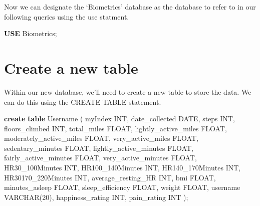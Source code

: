 \documentclass[]{book}
\newenvironment{Shaded}{\begin{snugshade}}{\end{snugshade}}
\newcommand{\KeywordTok}[1]{\textcolor[rgb]{0.13,0.29,0.53}{\textbf{#1}}}
\newcommand{\DataTypeTok}[1]{\textcolor[rgb]{0.13,0.29,0.53}{#1}}
\newcommand{\DecValTok}[1]{\textcolor[rgb]{0.00,0.00,0.81}{#1}}
\newcommand{\NormalTok}[1]{#1}
\begin{document}
Now we can designate the `Biometrics' database as the database to refer
to in our following queries using the use statment.

\begin{Shaded}
\begin{Highlighting}[]
\KeywordTok{USE}\NormalTok{ Biometrics;}
\end{Highlighting}
\end{Shaded}

\section{Create a new table}\label{create-a-new-table}

Within our new database, we'll need to create a new table to store the
data. We can do this using the CREATE TABLE statement.

\begin{Shaded}
\begin{Highlighting}[]
\KeywordTok{create} \KeywordTok{table}\NormalTok{ Username (}
\NormalTok{myIndex }\DataTypeTok{INT}\NormalTok{,}
\NormalTok{date_collected }\DataTypeTok{DATE}\NormalTok{,}
\NormalTok{steps }\DataTypeTok{INT}\NormalTok{,}
\NormalTok{floors_climbed }\DataTypeTok{INT}\NormalTok{,}
\NormalTok{total_miles }\DataTypeTok{FLOAT}\NormalTok{,}
\NormalTok{lightly_active_miles }\DataTypeTok{FLOAT}\NormalTok{,}
\NormalTok{moderately_active_miles }\DataTypeTok{FLOAT}\NormalTok{,}
\NormalTok{very_active_miles }\DataTypeTok{FLOAT}\NormalTok{,}
\NormalTok{sedentary_minutes }\DataTypeTok{FLOAT}\NormalTok{,}
\NormalTok{lightly_active_minutes }\DataTypeTok{FLOAT}\NormalTok{,}
\NormalTok{fairly_active_minutes }\DataTypeTok{FLOAT}\NormalTok{,}
\NormalTok{very_active_minutes }\DataTypeTok{FLOAT}\NormalTok{,}
\NormalTok{HR30_100Minutes }\DataTypeTok{INT}\NormalTok{,}
\NormalTok{HR100_140Minutes }\DataTypeTok{INT}\NormalTok{,}
\NormalTok{HR140_170Minutes }\DataTypeTok{INT}\NormalTok{,}
\NormalTok{HR30170_220Minutes }\DataTypeTok{INT}\NormalTok{,}
\NormalTok{average_resting_HR }\DataTypeTok{INT}\NormalTok{,}
\NormalTok{bmi }\DataTypeTok{FLOAT}\NormalTok{,}
\NormalTok{minutes_asleep }\DataTypeTok{FLOAT}\NormalTok{,}
\NormalTok{sleep_efficiency }\DataTypeTok{FLOAT}\NormalTok{,}
\NormalTok{weight }\DataTypeTok{FLOAT}\NormalTok{,}
\NormalTok{username }\DataTypeTok{VARCHAR}\NormalTok{(}\DecValTok{20}\NormalTok{),}
\NormalTok{happiness_rating }\DataTypeTok{INT}\NormalTok{,}
\NormalTok{pain_rating }\DataTypeTok{INT}
\NormalTok{);}
\end{Highlighting}
\end{Shaded}
\end{document}
